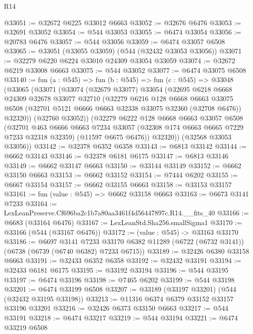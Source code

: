 \begin{lexlean}{R14}
\begin{coremodule}
@33051 := @32672 @6225 @33012 @6663
@33052 := @32676 @6476
@33053 := @32691 @33052
@33054 := @544 @33053
@33055 := @6474 @33054
@33056 := @20783 @6476
@33057 := @544 @33056
@33059 := @6474 @33057 @6508
@33065 := @33051 (@33055 @33059) (@544 (@32432 @33053 @33056))
@33071 := @32279 @6220 @6224 @33010 @24309 @33054 @33059
@33074 := @32672 @6219 @33008 @6663
@33075 := @544 @33052
@33077 := @6474 @33075 @6508
@33140 := fun (a : @545) =>
  fun (b : @545) =>
  fun (c : @545) =>
  @33048
    (@33065
      (@33071
        (@33074
          (@32679 @33077)
          @33054
          (@32695
            @6218
            @6668
            @24309
            @32678
            @33077
            @32710
            (@32279
              @6216
              @128
              @6668
              @6663
              @33075
              @6508
              (@32701 @5121 @6666 @6663 @32338 @33075 @32360 (@32708 @6476))
              @32320))
          (@32760 @33052))
        (@32279
          @6222
          @128
          @6668
          @6663
          @33057
          @6508
          (@32701
            @463
            @6666
            @6663
            @7234
            @33057
            (@32308 @174 @6663 @6665 @7229 @7233 @32318 @32359)
            (@11597 @6675 @6476))
          @32320))
      (@32568 @33053 @33056))
@33142 := @32378 @6352 @6358
@33143 := @6813 @33142
@33144 := @6662 @33143
@33146 := @32378 @6181 @6175
@33147 := @6813 @33146
@33149 := @6662 @33147 @6663
@33150 := @33144 @33149
@33152 := @6662 @33150 @6663
@33153 := @6662 @33152
@33154 := @7444 @6202
@33155 := @6667 @33154
@33157 := @6662 @33155 @6663
@33158 := @33153 @33157
@33161 := fun (value : @545) => @6662 @33158 @6663
@33163 := @6673 @3141 @7233
@33164 := LexLeanPreserve.Cf696ba2c1b7a80aa3461f4d56447897c.R14.__fits_40
@33166 := @6683 (@33164 @6476)
@33167 := LexLeanStd.Sha256.smallSigma1
@33170 := @33166 (@544 (@33167 @6476))
@33172 := (value : @545) -> @33163 @33170
@33186 := @6697
    @3141
    @7233
    @33170
    @6382
    @11289
    (@6722 (@6732 @3141))
    (@6738 (@6739 (@6740 @6382) @7233 @6715))
@33189 := @32426 @6380 @33158 @6663
@33191 := @32433 @6352 @6358
@33192 := @32432 @33191
@33194 := @32433 @6181 @6175
@33195 := @33192 @33194
@33196 := @544 @33195
@33197 := @6474 @33196
@33198 := @7465 @6202
@33199 := @544 @33198
@33201 := @6474 @33199 @6508
@33207 := @33189 (@33197 @33201) (@544 (@32432 @33195 @33198))
@33213 := @11316 @6374 @6379 @33152 @33157 @33196 @33201
@33216 := @32426 @6373 @33150 @6663
@33217 := @544 @33191
@33218 := @6474 @33217
@33219 := @544 @33194
@33221 := @6474 @33219 @6508

\end{coremodule}
\end{lexlean}
